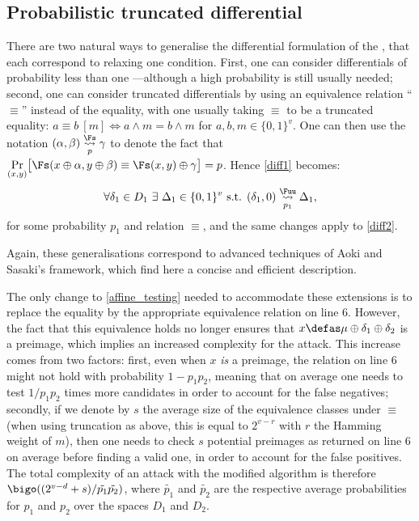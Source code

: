 \subsection{Probabilistic truncated differential \mitm}
\label{probtrunc}

There are two natural ways to generalise the differential formulation of the \mitm, that each correspond to relaxing one condition.
First, one can consider differentials of probability less than one ---although a high probability is still usually needed;
second, one can consider truncated differentials by using an
equivalence relation ``$\equiv$'' instead of the equality, with one usually taking $\equiv$ to be a truncated equality:
$a \equiv b~[m] \Leftrightarrow a \wedge m = b \wedge m$ for $a, b, m
\in \{0,1\}^v$.
One can then use the notation
$(\alpha,  \beta) \overset{\Fs}{\underset{p}{\rightsquigarrow}} \gamma$ to denote the fact that 
$\underset{(x,y)}{\Pr}\big[\Fs(x \oplus \alpha, y \oplus \beta) \equiv \Fs(x, y) \oplus \gamma\big] = p$. Hence \autoref{diff1} becomes:
\begin{equation}
\forall \delta_1 \in D_1~\exists~ \Delta_1 \in \{0,1\}^v \text{ s.t. } (\delta_1, 0) \overset{\Fuu}{\underset{p_1}{\rightsquigarrow}} \Delta_1,
\end{equation}
for some probability $p_1$ and relation $\equiv$, and the same changes apply to \autoref{diff2}.

Again, these generalisations correspond to advanced techniques of Aoki and Sasaki's framework, which find here a concise and efficient description.

\medskip

The only change to \autoref{affine_testing} needed to accommodate these extensions is to replace the equality by the appropriate equivalence
relation on line 6. However, the fact that this equivalence holds no longer ensures that $x \defas \mu \oplus \delta_1 \oplus \delta_2$ is a preimage,
which implies an increased complexity for the attack.
This increase comes from two factors:  first, even when $x$ \emph{is} a preimage, the relation on line 6 might not
hold with probability $1 - p_1p_2$, meaning that on average one needs to test $1/p_1p_2$ times more candidates in order to account for
the false negatives; secondly, if we denote by $s$ the average size of the equivalence classes under $\equiv$ (when using truncation as
above, this is equal to $2^{v - r}$ with $r$ the Hamming weight of $m$), then one needs to check $s$ potential preimages
as returned on line 6 on average before finding a valid one, in order to account for the false positives.
The total complexity of an attack with the modified algorithm is therefore $\bigo((2^{v-d} + s)/\tilde{p_1}\tilde{p_2})$, where $\tilde{p_1}$ and $\tilde{p_2}$ are the respective
average probabilities for $p_1$ and $p_2$ over the spaces $D_1$ and $D_2$.

